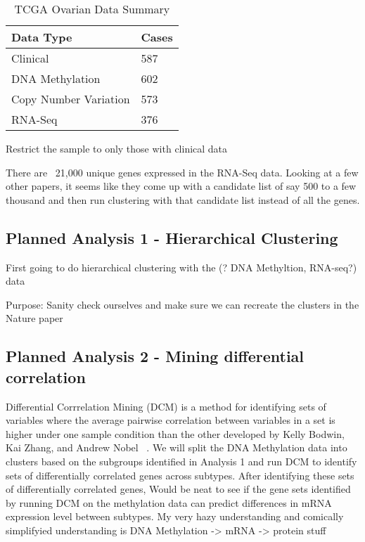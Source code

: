 \documentclass{article}
\begin{document}
\begin{table}[h!] \centering
  \begin{tabular}{ll} \toprule
  Data Type & Cases \\
  \hline
  Clinical & 587 \\
  DNA Methylation & 602 \\
  Copy Number Variation & 573 \\
  RNA-Seq & 376 \\
  \bottomrule
  \end{tabular}
\caption{TCGA Ovarian Data Summary}
\end{table}

Restrict the sample to only those with clinical data

There are ~21,000 unique genes expressed in the RNA-Seq data. Looking at a few other papers, it seems like they come up with a candidate list of say 500 to a few thousand and then run clustering with that candidate list instead of all the genes. 

\subsection{Planned Analysis 1 - Hierarchical Clustering}

First going to do hierarchical clustering with the (? DNA Methyltion, RNA-seq?) data \cite{eisen_cluster_1998}

Purpose: Sanity check ourselves and make sure we can recreate the clusters in the Nature paper \cite{cancer2011integrated}

\subsection{Planned Analysis 2 - Mining differential correlation} 
Differential Corrrelation Mining (DCM) is a method for identifying sets of variables where the average pairwise correlation between variables in a set is higher under one sample condition
than the other developed by Kelly Bodwin, Kai Zhang, and Andrew Nobel ~\cite{difcor2016}. We will split the DNA Methylation data into clusters based on the subgroups identified in Analysis 1 and run DCM to identify sets of differentially correlated genes across subtypes. 
  After identifying these sets of differentially correlated genes, 
Would be neat to see if the gene sets identified by running DCM on the methylation data can predict differences in mRNA expression level between subtypes. My very hazy understanding and comically simplifyied understanding is DNA Methylation -> mRNA -> protein stuff 
\end{document}
